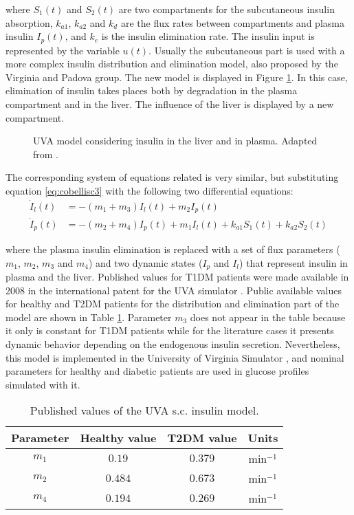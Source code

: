 where $S_{1}(t)$ and $S_{2}(t)$ are two compartments for the subcutaneous insulin absorption, $k_{a1}$, $k_{a2}$ and $k_{d}$ are the flux rates between compartments and plasma insulin ${I}_{p}(t)$, and $k_{e}$ is the insulin elimination rate. The insulin input is represented by the variable $u(t)$. Usually the subcutaneous part is used with a more complex insulin distribution and elimination model, also proposed by the Virginia and Padova group. The new model is displayed in Figure \ref{fig:cobellisc2}. In this case, elimination of insulin takes places both by degradation in the plasma compartment and in the liver. The influence of the liver is displayed by a new compartment.

\begin{figure}[hbtp]
\centering
{}\caption{UVA model considering insulin in the liver and in plasma. Adapted from \cite{man2007meal}.}
\label{fig:cobellisc2}
\end{figure}

The corresponding system of equations related is very similar, but substituting equation \eqref{eq:cobellisc3}  with the following two differential equations:
\begin{align}
	\dot{I}_{l}(t) &= -(m_{1}+m_{3})I_{l}(t)+m_{2}I_{p}(t) \label{eq:cobellisc4}\\
	\dot{I}_{p}(t) &= -(m_{2}+m_{4})I_{p}(t)+m_{1}I_{l}(t)+ k_{a1}S_{1}(t)+k_{a2}S_{2}(t) \label{eq:cobellisc5}
\end{align}

where the plasma insulin elimination is replaced with a set of flux parameters ($m_1$, $m_2$, $m_3$ and $m_4$) and two dynamic states ($I_p$ and $I_l$) that represent insulin in plasma and the liver. Published values for T1DM patients were made available in 2008 in the international patent for the UVA simulator \cite{UVAsimpatente}. Public available values \cite{man2007meal} for healthy and T2DM patients for the distribution and elimination part of the model are shown in Table \ref{tab:cobelli_insulin}. Parameter $m_{3}$ does not appear in the table because it only is constant for T1DM patients while for the literature cases it presents dynamic behavior depending on the endogenous insulin secretion. Nevertheless, this model is implemented in the University of Virginia Simulator \cite{kovatchev2009biosimulation}, and nominal parameters for healthy and diabetic patients are used in glucose profiles simulated with it.

\begin{table}[hbtp]
	\centering
		\begin{tabular}{|c c c c|}
		\hline 
		Parameter &	Healthy value & T2DM value & Units \\
		\hline
		$m_{1}$ & $0.19$ & $0.379$ & min$^{-1}$ \\
		$m_{2}$ & $0.484$ & $0.673$ & min$^{-1}$ \\
		$m_{4}$ & $0.194$ & $0.269$ & min$^{-1}$ \\
		\hline		
		\end{tabular}
	\caption{Published values of the UVA s.c. insulin model.}
	\label{tab:cobelli_insulin}
\end{table}

